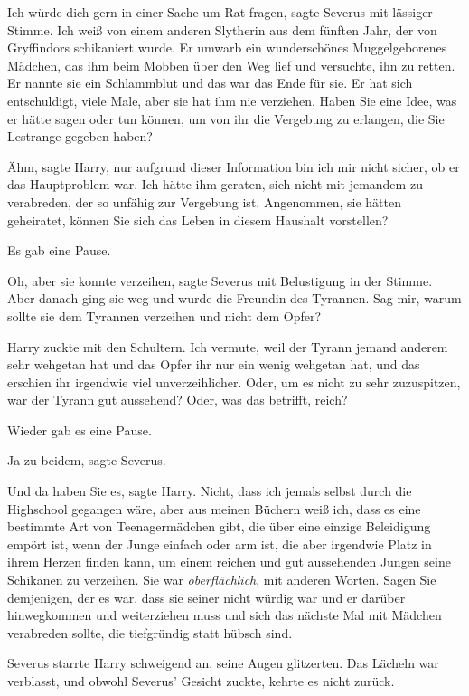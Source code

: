 \glqq{}Ich würde dich gern in einer Sache um Rat fragen\grqq{}, sagte Severus
mit lässiger Stimme. \glqq{}Ich weiß von einem anderen Slytherin aus dem fünften
Jahr, der von Gryffindors schikaniert wurde. Er umwarb ein wunderschönes
Muggelgeborenes Mädchen, das ihm beim Mobben über den Weg lief und versuchte,
ihn zu retten. Er nannte sie ein Schlammblut und das war das Ende für sie. Er
hat sich entschuldigt, viele Male, aber sie hat ihm nie verziehen. Haben Sie
eine Idee, was er hätte sagen oder tun können, um von ihr die Vergebung zu
erlangen, die Sie Lestrange gegeben haben?\grqq{}

\glqq{}Ähm\grqq{}, sagte Harry, \glqq{}nur aufgrund dieser Information bin ich
mir nicht sicher, ob er das Hauptproblem war. Ich hätte ihm geraten, sich nicht
mit jemandem zu verabreden, der so unfähig zur Vergebung ist. Angenommen, sie
hätten geheiratet, können Sie sich das Leben in diesem Haushalt
vorstellen?\grqq{}

Es gab eine Pause.

\glqq{}Oh, aber sie konnte verzeihen\grqq{}, sagte Severus mit Belustigung in
der Stimme. \glqq{}Aber danach ging sie weg und wurde die Freundin des Tyrannen.
Sag mir, warum sollte sie dem Tyrannen verzeihen und nicht dem Opfer?\grqq{}

Harry zuckte mit den Schultern. \glqq{}Ich vermute, weil der Tyrann jemand
anderem sehr wehgetan hat und das Opfer ihr nur ein wenig wehgetan hat, und das
erschien ihr irgendwie viel unverzeihlicher. Oder, um es nicht zu sehr
zuzuspitzen, war der Tyrann gut aussehend? Oder, was das betrifft, reich?\grqq{}

Wieder gab es eine Pause.

\glqq{}Ja zu beidem\grqq{}, sagte Severus.

\glqq{}Und da haben Sie es\grqq{}, sagte Harry. \glqq{}Nicht, dass ich jemals
selbst durch die Highschool gegangen wäre, aber aus meinen Büchern weiß ich,
dass es eine bestimmte Art von Teenagermädchen gibt, die über eine einzige
Beleidigung empört ist, wenn der Junge einfach oder arm ist, die aber irgendwie
Platz in ihrem Herzen finden kann, um einem reichen und gut aussehenden Jungen
seine Schikanen zu verzeihen. Sie war \emph{oberflächlich}, mit anderen Worten.
Sagen Sie demjenigen, der es war, dass sie seiner nicht würdig war und er
darüber hinwegkommen und weiterziehen muss und sich das nächste Mal mit Mädchen
verabreden sollte, die tiefgründig statt hübsch sind.\grqq{}

Severus starrte Harry schweigend an, seine Augen glitzerten. Das Lächeln war
verblasst, und obwohl Severus' Gesicht zuckte, kehrte es nicht zurück.

